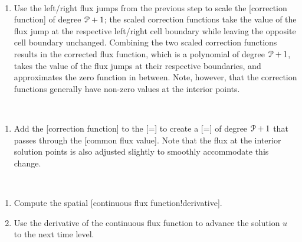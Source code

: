 \begin{minipage}{\lenColB}
\end{minipage}%
\\
\begin{minipage}{\lenColA}
\begin{enumerate}
\item[5.]
Use the left\slash right flux jumps from the previous step to scale the
[correction function] of
degree ${\cal P}+1$; the scaled correction functions take the value of the flux
jump at the respective left\slash right cell boundary while leaving the
opposite cell boundary unchanged.
%
Combining the two scaled correction functions results in the corrected flux
function, which is a polynomial of degree ${\cal P}+1$, takes the value of the flux
jumps at their respective boundaries, and approximates the zero function in
between. 
%
Note, however, that the correction functions generally have non-zero values at
the interior points.
\end{enumerate}
\end{minipage}%
\begin{minipage}{\lenColB}
\end{minipage}%
\\
\begin{minipage}{\lenColA}
\begin{enumerate}
\item[6.]
Add the [correction function]
to  the [=]
to create a [=]
of degree ${\cal P}+1$ that passes through the
[common flux value].
%
Note that the flux at the interior solution points is also adjusted
slightly to smoothly accommodate this change.
\end{enumerate}
\end{minipage}%
\begin{minipage}{\lenColB}
\end{minipage}%
\\
\begin{enumerate}
\item[7.]
Compute the spatial
    [continuous flux function!derivative].
\item[8.]
Use the derivative of the continuous flux function to advance the
solution $u$ to the next time level.
\end{enumerate}

